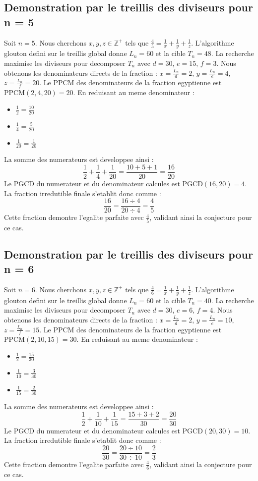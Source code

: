\documentclass[11pt,a4paper]{article}
\begin{document}
\subsection{Demonstration par le treillis des diviseurs pour n = 5}
Soit $n = 5$. Nous cherchons $x, y, z \in \mathbb{Z}^{+}$ tels que $\frac{4}{5} = \frac{1}{x} + \frac{1}{y} + \frac{1}{z}$.
L'algorithme glouton defini sur le treillis global donne $L_n = 60$ et la cible $T_n = 48$.
La recherche maximise les diviseurs pour decomposer $T_n$ avec $d = 30$, $e = 15$, $f = 3$.
Nous obtenons les denominateurs directs de la fraction : $x = \frac{L_n}{d} = 2$, $y = \frac{L_n}{e} = 4$, $z = \frac{L_n}{f} = 20$.
Le PPCM des denominateurs de la fraction egyptienne est $\text{PPCM}(2, 4, 20) = 20$.
En reduisant au meme denominateur :
\begin{itemize}
    \item $\frac{1}{2} = \frac{10}{20}$
    \item $\frac{1}{4} = \frac{5}{20}$
    \item $\frac{1}{20} = \frac{1}{20}$
\end{itemize}
La somme des numerateurs est developpee ainsi :
$$ \frac{1}{2} + \frac{1}{4} + \frac{1}{20} = \frac{10 + 5 + 1}{20} = \frac{16}{20} $$
Le PGCD du numerateur et du denominateur calcules est $\text{PGCD}(16, 20) = 4$.
La fraction irredutible finale s'etablit donc comme :
$$ \frac{16}{20} = \frac{16 \div 4}{20 \div 4} = \frac{4}{5} $$
Cette fraction demontre l'egalite parfaite avec $\frac{4}{5}$, validant ainsi la conjecture pour ce cas.

\subsection{Demonstration par le treillis des diviseurs pour n = 6}
Soit $n = 6$. Nous cherchons $x, y, z \in \mathbb{Z}^{+}$ tels que $\frac{4}{6} = \frac{1}{x} + \frac{1}{y} + \frac{1}{z}$.
L'algorithme glouton defini sur le treillis global donne $L_n = 60$ et la cible $T_n = 40$.
La recherche maximise les diviseurs pour decomposer $T_n$ avec $d = 30$, $e = 6$, $f = 4$.
Nous obtenons les denominateurs directs de la fraction : $x = \frac{L_n}{d} = 2$, $y = \frac{L_n}{e} = 10$, $z = \frac{L_n}{f} = 15$.
Le PPCM des denominateurs de la fraction egyptienne est $\text{PPCM}(2, 10, 15) = 30$.
En reduisant au meme denominateur :
\begin{itemize}
    \item $\frac{1}{2} = \frac{15}{30}$
    \item $\frac{1}{10} = \frac{3}{30}$
    \item $\frac{1}{15} = \frac{2}{30}$
\end{itemize}
La somme des numerateurs est developpee ainsi :
$$ \frac{1}{2} + \frac{1}{10} + \frac{1}{15} = \frac{15 + 3 + 2}{30} = \frac{20}{30} $$
Le PGCD du numerateur et du denominateur calcules est $\text{PGCD}(20, 30) = 10$.
La fraction irredutible finale s'etablit donc comme :
$$ \frac{20}{30} = \frac{20 \div 10}{30 \div 10} = \frac{2}{3} $$
Cette fraction demontre l'egalite parfaite avec $\frac{4}{6}$, validant ainsi la conjecture pour ce cas.
\end{document}
